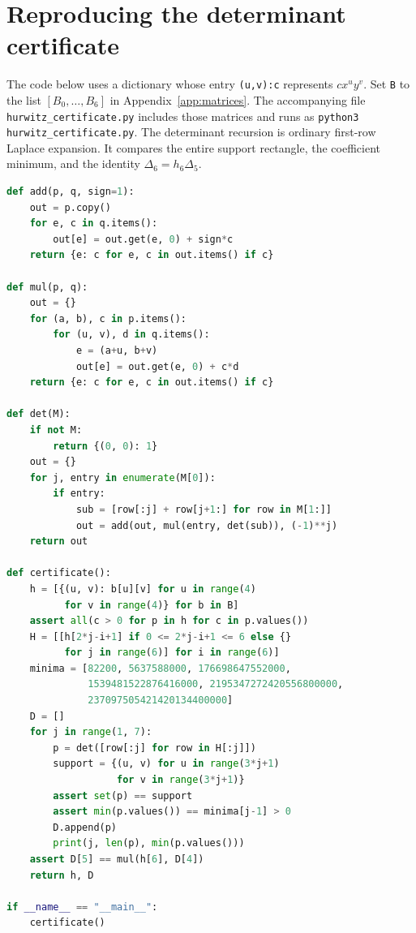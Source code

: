 \documentclass[11pt]{article}
\begin{document}
\section{Reproducing the determinant certificate}\label{app:arithmetic}

The code below uses a dictionary whose entry \texttt{(u,v):c}
represents $cx^uy^v$. Set \texttt{B} to the list
$[B_0,\ldots,B_6]$ in Appendix~\ref{app:matrices}.
The accompanying file \texttt{hurwitz\_certificate.py} includes those
matrices and runs as \texttt{python3 hurwitz\_certificate.py}.
The determinant recursion is ordinary first-row Laplace expansion.
It compares the entire support rectangle, the coefficient minimum,
and the identity $\Delta_6=h_6\Delta_5$.
\begin{lstlisting}[language=Python,basicstyle=\ttfamily\footnotesize,
  columns=fullflexible,keepspaces=true,showstringspaces=false,
  breaklines=true,frame=single,framesep=5pt]
def add(p, q, sign=1):
    out = p.copy()
    for e, c in q.items():
        out[e] = out.get(e, 0) + sign*c
    return {e: c for e, c in out.items() if c}

def mul(p, q):
    out = {}
    for (a, b), c in p.items():
        for (u, v), d in q.items():
            e = (a+u, b+v)
            out[e] = out.get(e, 0) + c*d
    return {e: c for e, c in out.items() if c}

def det(M):
    if not M:
        return {(0, 0): 1}
    out = {}
    for j, entry in enumerate(M[0]):
        if entry:
            sub = [row[:j] + row[j+1:] for row in M[1:]]
            out = add(out, mul(entry, det(sub)), (-1)**j)
    return out

def certificate():
    h = [{(u, v): b[u][v] for u in range(4)
          for v in range(4)} for b in B]
    assert all(c > 0 for p in h for c in p.values())
    H = [[h[2*j-i+1] if 0 <= 2*j-i+1 <= 6 else {}
          for j in range(6)] for i in range(6)]
    minima = [82200, 5637588000, 176698647552000,
              1539481522876416000, 2195347272420556800000,
              237097505421420134400000]
    D = []
    for j in range(1, 7):
        p = det([row[:j] for row in H[:j]])
        support = {(u, v) for u in range(3*j+1)
                   for v in range(3*j+1)}
        assert set(p) == support
        assert min(p.values()) == minima[j-1] > 0
        D.append(p)
        print(j, len(p), min(p.values()))
    assert D[5] == mul(h[6], D[4])
    return h, D

if __name__ == "__main__":
    certificate()
\end{lstlisting}

\clearpage


\end{document}
